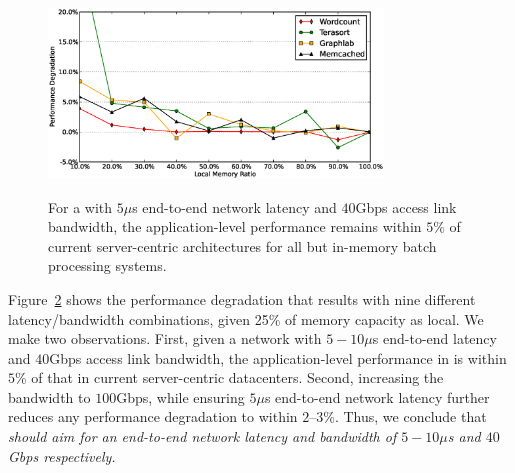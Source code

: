 %
\begin{figure}
  \centering
    \includegraphics[width = 3.5in]{img/vary_remote_mem.eps} 
  \caption{\small{}}
  \label{fig:impb}
\end{figure}
%
%
\begin{figure}

  \centering
  \caption{\small{For a \dis with $5\mu$s end-to-end network latency and $40$Gbps access link bandwidth, the application-level performance remains within $5\%$ of current server-centric architectures for all but in-memory batch processing systems.}}
  \label{fig:latb}
\end{figure}
%
Figure~\ref{fig:latb} shows the performance degradation that results with nine different latency/bandwidth combinations, given 25\% of memory capacity as local.%
We make two observations. First, given a network with $5-10\mu$s end-to-end latency and $40$Gbps access link bandwidth, the application-level performance in \dis is within $5\%$ of that in current server-centric datacenters. Second, increasing the bandwidth to $100$Gbps, while ensuring $5\mu$s end-to-end network latency further reduces any performance degradation to within $2$--$3\%$.
Thus, we conclude that \emph{\dis should aim for an end-to-end network latency and bandwidth of $5-10\mu$s and $40$Gbps respectively.}

